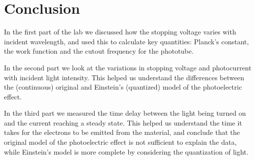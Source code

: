 \section{Conclusion}

In the first part of the lab we discussed how the stopping voltage varies with incident wavelength, and used this to calculate key quantities: Planck's
constant, the work function and the cutout frequency for the phototube.

In the second part we look at the variations in stopping voltage and photocurrent with incident light intensity.
This helped us understand the differences between the (continuous) original and Einstein's (quantized) model of the photoelectric effect.

In the third part we measured the time delay between the light being turned on and the current reaching a steady state.
This helped us understand the time it takes for the electrons to be emitted from the material,
and conclude that the original model of the photoelectric effect is not sufficient to explain the data, while
Einstein's model is more complete by considering the quantization of light.